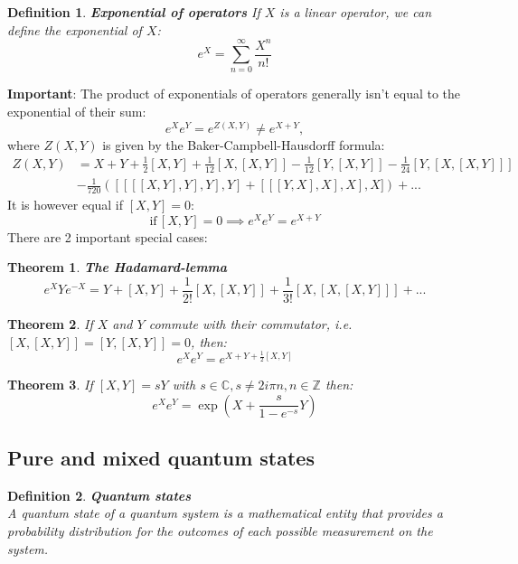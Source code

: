 \documentclass[12pt, a4paper]{article}
\newtheorem{theorem}{Theorem}
\newtheorem{definition}{Definition}
\begin{document}
\begin{definition}
    \textbf{Exponential of operators}
    If $X$ is a linear operator, we can define the exponential of $X$:
    \begin{equation*}
        e^X = \sum\limits_{n=0}^\infty \frac{X^n}{n!} 
    \end{equation*}
\end{definition}
\textbf{Important}:
The product of exponentials of operators generally isn't equal to the exponential of their sum:
\begin{equation*}
    e^{X}e^{Y} = e^{Z(X,Y)}\neq e^{X+Y},
\end{equation*}
where $Z(X,Y)$ is given by the Baker-Campbell-Hausdorff formula:
\begin{align*}
    Z(X,Y) &= X + Y + \frac{1}{2}[X,Y] + \frac{1}{12}[X,[X,Y]] - \frac{1}{12}[Y,[X,Y]] -\frac{1}{24}[Y,[X,[X,Y]]] \\
    & - \frac{1}{720}([[[[X,Y],Y],Y],Y] + [[[Y,X],X],X],X]) + ...
\end{align*}
It is however equal if $[X,Y]=0$:
\begin{equation*}
    \textrm{if}\,[X,Y]=0 \implies  e^{X}e^{Y} = e^{X+Y}
\end{equation*}
There are 2 important special cases:
\begin{theorem}
    \textbf{The Hadamard-lemma}
    \begin{equation*}
        e^XYe^{-X} = Y + [X,Y] + \frac{1}{2!}[X,[X,Y]] + \frac{1}{3!}[X,[X,[X,Y]]] + ...
    \end{equation*}
\end{theorem}

\begin{theorem}
    If $X$ and $Y$ commute with their commutator, i.e. $[X, [X,Y]] = [Y, [X,Y]] = 0$, then:
    \begin{equation*}
        e^Xe^Y = e^{X+Y+\frac{1}{2}[X,Y]}
    \end{equation*}
\end{theorem}

\begin{theorem}
    If $[X,Y] = sY$ with $s\in\mathbb{C}, s\neq 2i\pi n, n\in \mathbb Z$ then:
    \begin{equation*}
        e^Xe^Y = \exp\left(X + \frac{s}{1-e^{-s}}Y \right)
    \end{equation*}
\end{theorem}

\subsection{Pure and mixed quantum states}
\begin{definition}
    \textbf{Quantum states}\\
    A quantum state of a quantum system is a mathematical entity that provides a probability distribution 
    for the outcomes of each possible measurement on the system.
\end{definition}
\end{document}
